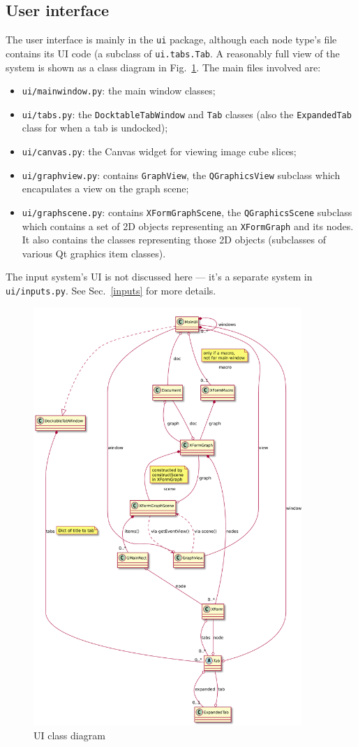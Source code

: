 \subsection{User interface}
The user interface is mainly in the \texttt{ui} package, although each
node type's file contains its UI code (a subclass of \texttt{ui.tabs.Tab}.
A reasonably full view of the system is shown as a class diagram
in Fig.~\ref{ui.pdf}.
The main files involved are:
\begin{itemize}
\item \texttt{ui/mainwindow.py}: the main window classes;
\item \texttt{ui/tabs.py}: the \texttt{DocktableTabWindow} and \texttt{Tab}
classes (also the \texttt{ExpandedTab} class for when a tab is undocked);
\item \texttt{ui/canvas.py}: the Canvas widget for viewing image cube slices;
\item \texttt{ui/graphview.py}: contains \texttt{GraphView}, the
\texttt{QGraphicsView} subclass which encapulates a view on the graph scene;
\item \texttt{ui/graphscene.py}: contains \texttt{XFormGraphScene},
the \texttt{QGraphicsScene} subclass which contains a set of 2D objects
representing an \texttt{XFormGraph} and its nodes. It also contains the
classes representing those 2D objects (subclasses of various Qt graphics item
classes).
\end{itemize}
The input system's UI is not discussed here --- it's a separate
system in \texttt{ui/inputs.py}. See Sec.~\ref{inputs} for more details.


\begin{figure}[ht]
\center
\includegraphics[width=4in]{ui.pdf}
\caption{UI class diagram}
\label{ui.pdf}
\end{figure}


